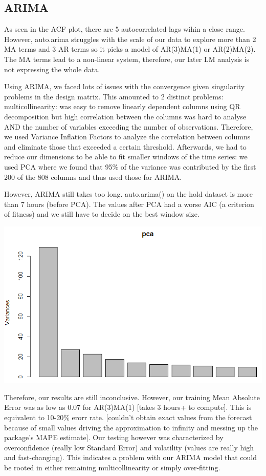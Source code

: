 \documentclass{article}
\begin{document}
	\subsection{ARIMA}
	As seen in the ACF plot, there are 5 autocorrelated lags wihin a close range. However, auto.arima struggles with the scale of our data to explore more than 2 MA terms and 3 AR terms so it picks a model of AR(3)MA(1) or AR(2)MA(2). The MA terms lead to a non-linear system, therefore, our later LM analysis is not expressing the whole data.
	
	Using ARIMA, we faced lots of issues with the convergence given singularity problems in the design matrix. This amounted to 2 distinct problems: multicollinearity: was easy to remove linearly dependent columns using QR decomposition but high correlation between the columns was hard to analyse AND the number of variables exceeding the number of observations. Therefore, we used Variance Inflation Factors to analyze the correlation between columns and eliminate those that exceeded a certain threshold. Afterwards, we had to reduce our dimensions to be able to fit smaller windows of the time series: we used PCA where we found that 95$\%$ of the variance was contributed by the first 200 of the 808 columns and thus used those for ARIMA.
	
	However, ARIMA still takes too long. auto.arima() on the hold dataset is more than 7 hours (before PCA). The values after PCA had a worse AIC (a criterion of fitness) and we still have to decide on the best window size.
	\begin{center}
	\includegraphics[scale=0.7]{../PCA.PNG}	
	\end{center}
	Therefore, our results are still inconclusive. However, our training Mean Absolute Error was as low as 0.07 for AR(3)MA(1) [takes 3 hours+ to compute]. This is equivalent to 10-20\% erorr rate. [couldn't obtain exact values from the forecast because of small values driving the approximation to infinity and messing up the package's MAPE estimate].
	Our testing however was characterized by overconfidence (really low Standard Error) and volatility (values are really high and fast-changing). This indicates a problem with our ARIMA model that could be rooted in either remaining multicollinearity or simply over-fitting.
\end{document}
